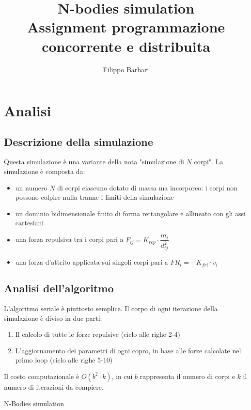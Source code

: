 \documentclass[12pt,a4paper,oneside]{article}
\begin{document}
	
	\title{N-bodies simulation\\Assignment programmazione concorrente e distribuita}
	\author{Filippo Barbari}
	\date{}%
	\maketitle
	
	\tableofcontents
	\newpage
	
	\section{Analisi}
	\subsection{Descrizione della simulazione}
	Questa simulazione è una variante della nota "simulazione di $N$ corpi". La simulazione è composta da:
	\begin{itemize}
		\item un numero $N$ di corpi ciascuno dotato di massa ma incorporeo: i corpi non possono colpire nulla tranne i limiti della simulazione
		\item un dominio bidimensionale finito di forma rettangolare e allineato con gli assi cartesiani
		\item una forza repulsiva tra i corpi pari a $F_{ij}=K_{rep}\cdot\dfrac{m_i}{d_{ij}^2}$
		\item una forza d'attrito applicata sui singoli corpi pari a $FR_i=-K_{fri}\cdot{v_i}$
	\end{itemize}
	
	\subsection{Analisi dell'algoritmo}
	L'algoritmo seriale è piuttosto semplice. Il corpo di ogni iterazione della simulazione è diviso in due parti:
	\begin{enumerate}
		\item Il calcolo di tutte le forze repulsive (ciclo alle righe 2-4)
		\item L'aggiornamento dei parametri di ogni copro, in base alle forze calcolate nel primo loop (ciclo alle righe 5-10)
	\end{enumerate}
	Il costo computazionale è $O(b^2\cdot k)$, in cui $b$ rappresenta il numero di corpi e $k$ il numero di iterazioni da compiere.
	\begin{algorithm}
		
		\caption{N-Bodies simulation}
	\end{algorithm}
	
\end{document}
